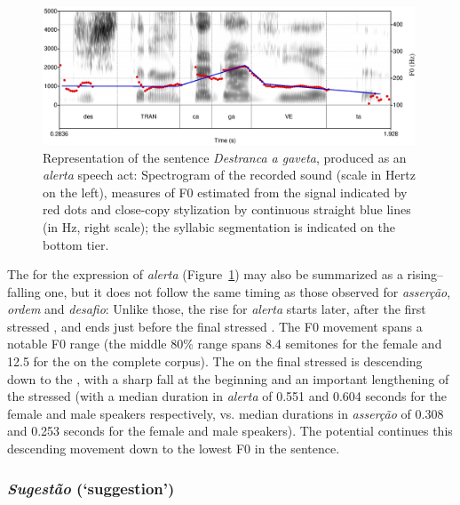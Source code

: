 \documentclass[output=paper]{LSP/langsci}
\begin{document}
\begin{figure}

\includegraphics[width=0.99\textwidth]{figures/MOR7.eps}
\caption{Representation of the sentence \textit{Destranca a gaveta}, produced as an \textit{alerta} speech act: Spectrogram of the recorded sound (scale in Hertz on the left), measures of F0 estimated from the signal indicated by red dots and close-copy stylization by continuous straight blue lines (in Hz, right scale); the syllabic segmentation is indicated on the bottom tier.}
\label{figure:CC5}
\end{figure}

The  for the expression of \textit{alerta} (Figure~\ref{figure:CC5}) may also be summarized as a rising–falling one, but it does not follow the same timing as those observed for \textit{asserção}, \textit{ordem} and \textit{desafio}: Unlike those, the rise for \textit{alerta} starts later, after the first stressed , and ends just before the final stressed . 
The F0 movement spans a notable F0 range (the middle 80\% range spans 8.4 semitones for the female and 12.5 for the  on the complete corpus). 
The  on the final stressed  is descending down to the , with a sharp fall at the beginning and an important lengthening of the stressed  (with a median duration in \textit{alerta} of 0.551 and 0.604 seconds for the female and male speakers respectively, vs. median durations in \textit{asserção} of 0.308 and 0.253 seconds for the female and male speakers).\largerpage
The potential  continues this descending movement down to the lowest F0 in the sentence.


\subsubsection{\textit{Sugestão} (`suggestion')}
\end{document}
